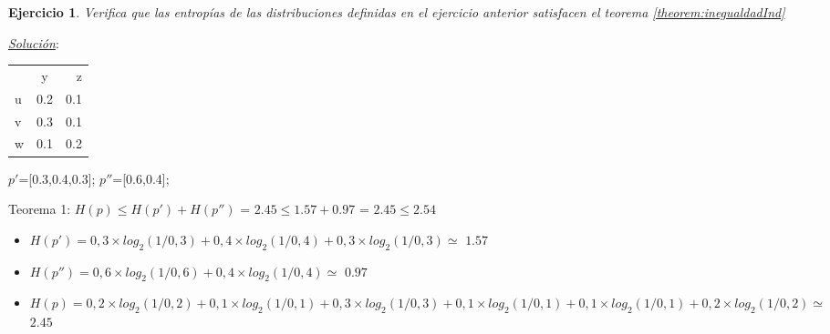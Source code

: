 \documentclass{beamer}
\theoremstyle{plain}
\theoremstyle{example}
\newtheorem{ejercicio} [Ejercicio]{Ejercicio}
\theoremstyle{example}
\begin{document}
\begin{frame}  \small 

\begin{ejercicio}

Verifica que las entropías de las distribuciones definidas en el ejercicio anterior satisfacen el teorema \ref{theorem:inegualdadInd}\\
\end{ejercicio}
\pause
\textit{\underline{Solución}}:\\
\begin{center}
    \begin{tabular}{ l c r }
         & y & z \\
   u & 0.2 & 0.1 \\
   v & 0.3 & 0.1 \\
   w & 0.1 & 0.2 \\
 \end{tabular}
\vspace{0.5cm} 
$p'$=[0.3,0.4,0.3]; $p''$=[0.6,0.4]; 
\end{center}


Teorema 1: $H(p) \leq H(p') + H(p'')$ = $2.45 \leq 1.57 + 0.97$ = {\boldmath $2.45 \leq 2.54$}
\vspace{0.5cm} 

\begin{itemize}
\item $H(p') = 0,3 \times log_2(1/0,3)+0,4 \times log_2(1/0,4)+0,3 \times log_2(1/0,3) \simeq  $ {\boldmath  $1.57$}
\item $H(p'')= 0,6 \times log_2(1/0,6 )+0,4 \times log_2(1/0,4)\simeq  $ {\boldmath  $0.97$}  
\item $H(p)  = 0,2 \times log_2(1/0,2 )+ 0,1 \times log_2(1/0,1) +
 0,3 \times log_2(1/0,3 )+ 0,1 \times log_2(1/0,1) +  0,1 \times log_2(1/0,1 )+ 0,2 \times log_2(1/0,2) \simeq  $ {\boldmath  $2.45$}  
\end{itemize}

\end{frame} 
\end{document}
